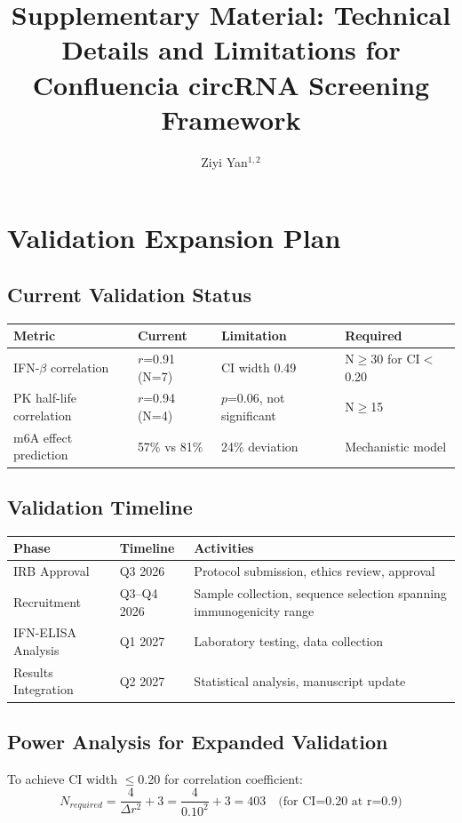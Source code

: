 \documentclass{article}
\title{Supplementary Material: Technical Details and Limitations for Confluencia circRNA Screening Framework}
\author{Ziyi Yan$^{1,2}$}
\begin{document}
\maketitle

\section{Validation Expansion Plan}

\subsection{Current Validation Status}
\begin{longtable}{llll}
\toprule
Metric & Current & Limitation & Required \\
\midrule
IFN-$\beta$ correlation & $r$=0.91 (N=7) & CI width 0.49 & N$\geq$30 for CI$<$0.20 \\
PK half-life correlation & $r$=0.94 (N=4) & $p$=0.06, not significant & N$\geq$15 \\
m6A effect prediction & 57\% vs 81\% & 24\% deviation & Mechanistic model \\
\bottomrule
\end{longtable}

\subsection{Validation Timeline}
\begin{longtable}{llp{6cm}}
\toprule
Phase & Timeline & Activities \\
\midrule
IRB Approval & Q3 2026 & Protocol submission, ethics review, approval \\
Recruitment & Q3--Q4 2026 & Sample collection, sequence selection spanning immunogenicity range \\
IFN-ELISA Analysis & Q1 2027 & Laboratory testing, data collection \\
Results Integration & Q2 2027 & Statistical analysis, manuscript update \\
\bottomrule
\end{longtable}

\subsection{Power Analysis for Expanded Validation}
To achieve CI width $\leq$0.20 for correlation coefficient:
\begin{equation}
N_{required} = \frac{4}{\Delta r^2} + 3 = \frac{4}{0.10^2} + 3 = 403 \quad \text{(for CI=0.20 at r=0.9)}
\end{equation}
\end{document}
